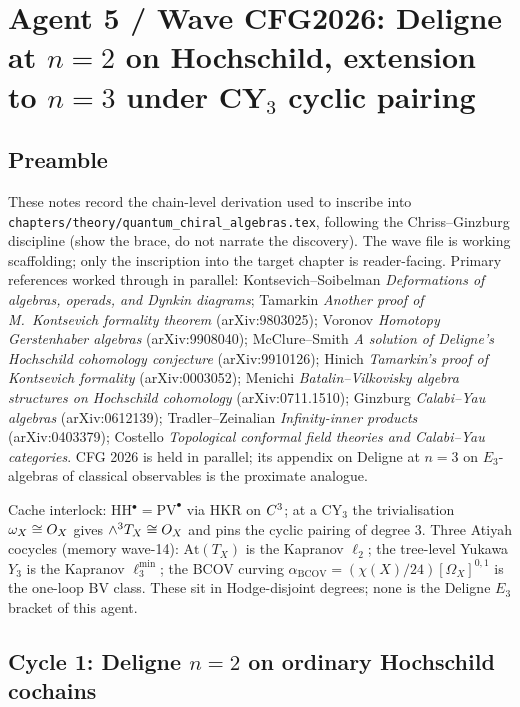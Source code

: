 \documentclass[11pt]{article}
\theoremstyle{definition}
\theoremstyle{remark}
\begin{document}
\section*{Agent 5 / Wave CFG2026: Deligne at $n=2$ on Hochschild,
extension to $n=3$ under CY$_3$ cyclic pairing}

\subsection*{Preamble}

These notes record the chain-level derivation used to inscribe into
\texttt{chapters/theory/quantum\_chiral\_algebras.tex}, following the
Chriss--Ginzburg discipline (show the brace, do not narrate the
discovery). The wave file is working scaffolding; only the inscription
into the target chapter is reader-facing. Primary references worked
through in parallel: Kontsevich--Soibelman \emph{Deformations of
algebras, operads, and Dynkin diagrams}; Tamarkin \emph{Another proof
of M.~Kontsevich formality theorem} (arXiv:9803025); Voronov
\emph{Homotopy Gerstenhaber algebras} (arXiv:9908040); McClure--Smith
\emph{A solution of Deligne's Hochschild cohomology conjecture}
(arXiv:9910126); Hinich \emph{Tamarkin's proof of Kontsevich formality}
(arXiv:0003052); Menichi \emph{Batalin--Vilkovisky algebra structures
on Hochschild cohomology} (arXiv:0711.1510); Ginzburg \emph{Calabi--Yau
algebras} (arXiv:0612139); Tradler--Zeinalian \emph{Infinity-inner
products} (arXiv:0403379); Costello \emph{Topological conformal field
theories and Calabi--Yau categories}. CFG 2026 is held in parallel;
its appendix on Deligne at $n=3$ on $E_3$-algebras of classical
observables is the proximate analogue.

Cache interlock: HH$^\bullet = \mathrm{PV}^\bullet$ via HKR on
$C^3$; at a CY$_3$ the trivialisation $\omega_X \cong O_X$ gives
$\wedge^3 T_X \cong O_X$ and pins the cyclic pairing of degree $3$.
Three Atiyah cocycles (memory wave-14): $\mathrm{At}(T_X)$ is the
Kapranov $\ell_2$; the tree-level Yukawa $Y_3$ is the Kapranov
$\ell_3^{\min}$; the BCOV curving $\alpha_{\mathrm{BCOV}} =
(\chi(X)/24)[\Omega_X]^{0,1}$ is the one-loop BV class. These sit in
Hodge-disjoint degrees; none is the Deligne $E_3$ bracket of this
agent.

\subsection*{Cycle 1: Deligne $n=2$ on ordinary Hochschild cochains}
\end{document}
